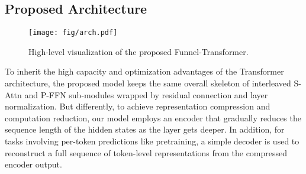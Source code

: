 \documentclass{article}
\theoremstyle{custom}
\begin{document}
\subsection{Proposed Architecture}
\label{sec:proposed}
\begin{figure}[!h]
\centering
\texttt{[image: fig/arch.pdf]}
\caption{High-level visualization of the proposed Funnel-Transformer.}
\label{fig:arch}
\vspace{-0.5em}
\end{figure}
To inherit the high capacity and optimization advantages of the Transformer architecture, the proposed model keeps the same overall skeleton of interleaved S-Attn and P-FFN sub-modules wrapped by residual connection and layer normalization.
But differently, to achieve representation compression and computation reduction, our model employs an encoder that gradually reduces the sequence length of the hidden states as the layer gets deeper.
In addition, for tasks involving per-token predictions like pretraining, a simple decoder is used to reconstruct a full sequence of token-level representations from the compressed encoder output.
\end{document}

